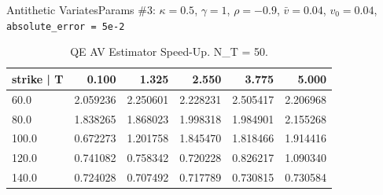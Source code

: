     \begin{frame}{Antithetic Variates}{Params \#3: $\kappa = 0.5$, $\gamma = 1$, $\rho = -0.9$, $\bar v = 0.04$, $v_0 = 0.04$, \texttt{absolute\_error = 5e-2}}
        \begin{table}
            \begin{tabular}{lrrrrr}
                \toprule
                strike | T &     0.100 &     1.325 &     2.550 &     3.775 &     5.000 \\
                \midrule
                60.0   &  2.059236 &  2.250601 &  2.228231 &  2.505417 &  2.206968 \\
                80.0   &  1.838265 &  1.868023 &  1.998318 &  1.984901 &  2.155268 \\
                100.0  &  0.672273 &  1.201758 &  1.845470 &  1.818466 &  1.914416 \\
                120.0  &  0.741082 &  0.758342 &  0.720228 &  0.826217 &  1.090340 \\
                140.0  &  0.724028 &  0.707492 &  0.717789 &  0.730815 &  0.730584 \\
                \bottomrule
                \end{tabular}
            \caption{QE AV Estimator Speed-Up. N\_T = 50.}
        \end{table}         
    \end{frame}